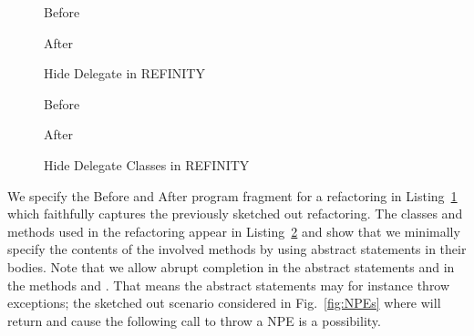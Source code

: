\begin{figure}[tbp]
  \captionsetup{type=lstlisting}
  \centering
  \begin{sublstlisting}[b]{.455\linewidth}
    
    \caption{Before}
    \label{lst:HideDelegate-nofields-before-refinity}
  \end{sublstlisting}\hspace{1cm}
  \begin{sublstlisting}[b]{.455\linewidth}
    
    \caption{After}
    \label{lst:HideDelegate-nofields-after-refinity}
  \end{sublstlisting}
\caption{Hide Delegate in REFINITY}
\label{lst:HideDelegate-nofields-refinity}
\end{figure}

\begin{figure}[tbp]
  \captionsetup{type=lstlisting}
  \centering
  \begin{sublstlisting}[b]{.4\linewidth}
    
    \caption{Before}
    \label{lst:HideDelegate-nofields-resource-refinity}
  \end{sublstlisting}\hspace{1cm}
  \begin{sublstlisting}[b]{.4\linewidth}
    
    \caption{After}
    \label{lst:HideDelegate-nofields-owner-refinity}
  \end{sublstlisting}
\caption{Hide Delegate Classes in REFINITY}
\label{lst:HideDelegate-nofields-classes-refinity}
\end{figure}
We specify the Before and After program fragment for a  refactoring in Listing~\ref{lst:HideDelegate-nofields-refinity} which faithfully captures the previously sketched out refactoring.
The classes and methods used in the refactoring appear in Listing~\ref{lst:HideDelegate-nofields-classes-refinity} and show that we minimally specify the contents of the involved methods by using abstract
statements in their bodies.
Note that we allow abrupt completion in the abstract statements  and  in the methods  and .
That means the abstract statements may for instance throw exceptions; the sketched out scenario considered in Fig.~\ref{fig:NPEs} where  will return  and cause the following call to throw a NPE is a possibility.

